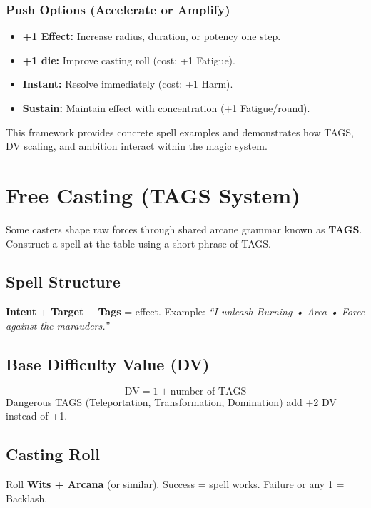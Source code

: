 \subsubsection{Push Options (Accelerate or Amplify)}
\begin{itemize}
    \item \textbf{+1 Effect:} Increase radius, duration, or potency one step.
    \item \textbf{+1 die:} Improve casting roll (cost: +1 Fatigue).
    \item \textbf{Instant:} Resolve immediately (cost: +1 Harm).
    \item \textbf{Sustain:} Maintain effect with concentration (+1 Fatigue/round).
\end{itemize}

\noindent This framework provides concrete spell examples and demonstrates how TAGS, DV scaling, and ambition interact within the magic system.

\clearpage

\section{Free Casting (TAGS System)}\label{sec:free_casting_tags}

Some casters shape raw forces through shared arcane grammar known as \textbf{TAGS}. Construct a spell at the table using a short phrase of TAGS.

\subsection{Spell Structure}
\textbf{Intent} + \textbf{Target} + \textbf{Tags} = effect. Example: \textit{``I unleash Burning • Area • Force against the marauders.''}

\subsection{Base Difficulty Value (DV)}
\[
\text{DV} = 1 + \text{number of TAGS}
\]
Dangerous TAGS (Teleportation, Transformation, Domination) add +2 DV instead of +1.

\subsection{Casting Roll}
Roll \textbf{Wits + Arcana} (or similar). Success = spell works. Failure or any 1 = Backlash.

